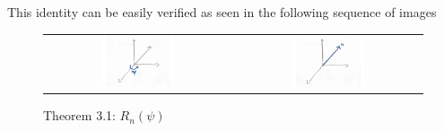 \documentclass[10pt]{ucthesis}
\begin{document}
This identity can be easily verified as seen in the following sequence of images\\

\begin{figure}[H]
	\centering
	\begin{tabular}{cc}
		\includegraphics[width=0.4\textwidth]{Rnpsi1.png}
&
		\includegraphics[width=0.4\textwidth]{Rnpsi2.png}
	\end{tabular}
	\caption{Theorem 3.1: $R_n(\psi)$}
	

\end{figure}
\end{document}
